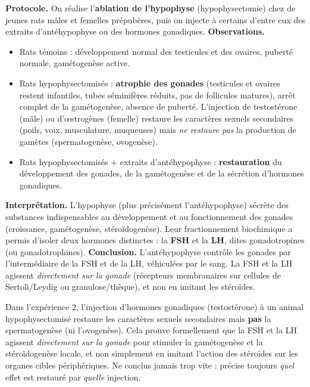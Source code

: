 \documentclass[11pt]{article}
\newcommand{\cle}[1]{{\popxbold\color{popdark}#1}}
\begin{document}
\begin{experience}
\textbf{Protocole.} On réalise l'\textbf{ablation de l'hypophyse} (hypophysectomie) chez de jeunes rats mâles et femelles prépubères, puis on injecte à certains d'entre eux des extraits d'antéhypophyse ou des hormones gonadiques.
\textbf{Observations.}
\begin{itemize}
\item Rats témoins : développement normal des testicules et des ovaires, puberté normale, gamétogenèse active.
\item Rats hypophysectomisés : \textbf{atrophie des gonades} (testicules et ovaires restent infantiles, tubes séminifères réduits, pas de follicules matures), arrêt complet de la gamétogenèse, absence de puberté. L'injection de testostérone (mâle) ou d'œstrogènes (femelle) restaure les caractères sexuels secondaires (poils, voix, musculature, muqueuses) mais \emph{ne restaure pas} la production de gamètes (spermatogenèse, ovogenèse).
\item Rats hypophysectomisés + extraits d'antéhypophyse : \textbf{restauration} du développement des gonades, de la gamétogenèse et de la sécrétion d'hormones gonadiques.
\end{itemize}
\textbf{Interprétation.} L'hypophyse (plus précisément l'antéhypophyse) sécrète des substances indispensables au développement et au fonctionnement des gonades (croissance, gamétogenèse, stéroïdogenèse). Leur fractionnement biochimique a permis d'isoler deux hormones distinctes : la \textbf{FSH} et la \textbf{LH}, dites \cle{gonadotropines} (ou gonadotrophines).
\textbf{Conclusion.} L'antéhypophyse contrôle les gonades par l'intermédiaire de la FSH et de la LH, véhiculées par le sang. La FSH et la LH agissent \emph{directement sur la gonade} (récepteurs membranaires sur cellules de Sertoli/Leydig ou granulose/thèque), et non en imitant les stéroïdes.
\end{experience}

\begin{attention}
Dans l'expérience 2, l'injection d'hormones gonadiques (testostérone) à un animal hypophysectomisé restaure les caractères sexuels secondaires mais \textbf{pas} la spermatogenèse (ni l'ovogenèse). Cela prouve formellement que la FSH et la LH agissent \emph{directement sur la gonade} pour stimuler la gamétogenèse et la stéroïdogenèse locale, et non simplement en imitant l'action des stéroïdes sur les organes cibles périphériques. Ne conclus jamais trop vite : précise toujours \emph{quel} effet est restauré par \emph{quelle} injection.
\end{attention}
\end{document}
